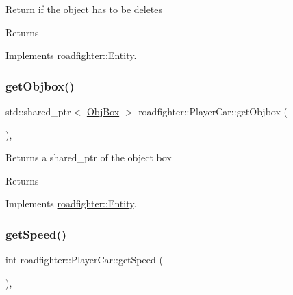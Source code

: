 Return if the object has to be deletes \begin{DoxyReturn}{Returns}

\end{DoxyReturn}


Implements \hyperlink{classroadfighter_1_1Entity_a08190b0b8e6a3fcdb42273d6096152ac}{roadfighter\+::\+Entity}.

\mbox{\label{classroadfighter_1_1PlayerCar_ac0b95a6ef2829905ad4717a52b7cb5eb}} 
\subsubsection{\texorpdfstring{get\+Objbox()}{getObjbox()}}
{\footnotesize\ttfamily std\+::shared\+\_\+ptr$<$ \hyperlink{structObjBox}{Obj\+Box} $>$ roadfighter\+::\+Player\+Car\+::get\+Objbox (\begin{DoxyParamCaption}{ }\end{DoxyParamCaption})\hspace{0.3cm}{\ttfamily [override]}, {\ttfamily [virtual]}}

Returns a shared\+\_\+ptr of the object box \begin{DoxyReturn}{Returns}

\end{DoxyReturn}


Implements \hyperlink{classroadfighter_1_1Entity_af14340d04a725175a6d221f23c35fa0c}{roadfighter\+::\+Entity}.

\mbox{\label{classroadfighter_1_1PlayerCar_a642a825b604a407ae4711bdafd054b22}} 
\subsubsection{\texorpdfstring{get\+Speed()}{getSpeed()}}
{\footnotesize\ttfamily int roadfighter\+::\+Player\+Car\+::get\+Speed (\begin{DoxyParamCaption}{ }\end{DoxyParamCaption})\hspace{0.3cm}{\ttfamily [override]}, {\ttfamily [virtual]}}

